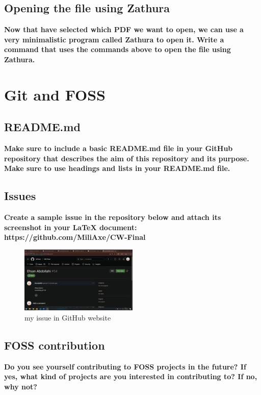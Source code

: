 \documentclass{article}
\begin{document}
\subsection{Opening the file using Zathura}
\textbf{Now that have selected which PDF we want to open, we can use a very minimalistic program called Zathura to open it. Write a command that uses the commands above to open the file using Zathura.}

\section{Git and FOSS}
\subsection{README.md}
\textbf{Make sure to include a basic README.md file in your GitHub repository that describes the aim of this repository and its purpose. 
Make sure to use headings and lists in your README.md file.}
\textcolor{green}{}
\subsection{Issues}
\textbf{Create a sample issue in the repository below and attach its screenshot in your LaTeX document: https://github.com/MiliAxe/CW-Final}
\begin{figure}[h]
    \centering
    \includegraphics[width=0.5\textwidth]{Screenshot.png}
    \caption{my issue in GitHub website}
    \label{fig:my_image}
\end{figure}
\subsection{FOSS contribution}
\textbf{Do you see yourself contributing to FOSS projects in the future? If yes, what kind of projects are you interested in contributing to? If no, why not?}
\end{document}

